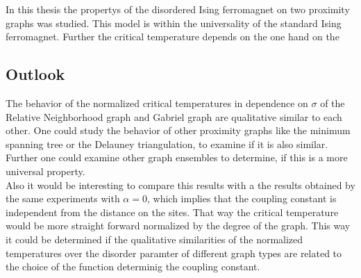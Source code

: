In this thesis the propertys of the disordered Ising ferromagnet on two
proximity graphs was studied. This model is within the universality of
the standard Ising ferromagnet. Further the critical temperature depends
on the one hand on the

\subsection{Outlook}
    The behavior of the normalized critical temperatures in dependence
    on \(\sigma\) of the Relative Neighborhood graph and Gabriel graph
    are qualitative similar to each other. One could study the behavior
    of other proximity graphs like the minimum spanning tree or the
    Delauney triangulation, to examine if it is also similar. Further
    one could examine other graph ensembles to determine, if this is a
    more universal property.\\
    Also it would be interesting to compare this results with a the
    results obtained by the same experiments with \(\alpha = 0\), which
    implies that the coupling constant is independent from the distance
    on the sites. That way the critical temperature would be more
    straight forward normalized by the degree of the graph. This way it
    could be determined if the qualitative similarities of the
    normalized temperatures over the disorder paramter of different
    graph types are related to the choice of the function determinig the
    coupling constant.

